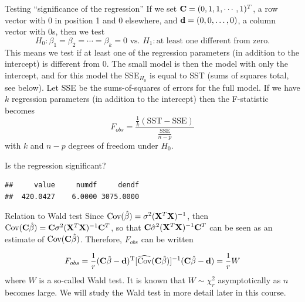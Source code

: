 \documentclass[
  ignorenonframetext,
]{beamer}
\newenvironment{Shaded}{\begin{snugshade}}{\end{snugshade}}
\newcommand{\FunctionTok}[1]{\textcolor[rgb]{0.13,0.29,0.53}{\textbf{#1}}}
\newcommand{\NormalTok}[1]{#1}
\newcommand{\SpecialCharTok}[1]{\textcolor[rgb]{0.81,0.36,0.00}{\textbf{#1}}}
\begin{document}
\begin{frame}
\begin{block}{Testing ``significance of the regression''}
\label{testing-significance-of-the-regression}
If we set \({\bf C}=(0,1,1, \cdots ,1)^T\), a row vector with 0 in
position 1 and 0 elsewhere, and \({\bf d}=(0,0,\ldots,0)\), a column
vector with 0s, then we test
\[ H_0: \beta_1=\beta_2=\cdots= \beta_k =0 \text{ vs. } H_1: \text{at least one different from zero}.\]
This means we test if at least one of the regression parameters (in
addition to the intercept) is different from 0. The small model is then
the model with only the intercept, and for this model the SSE\(_{H_0}\)
is equal to SST (sums of squares total, see below). Let SSE be the
sums-of-squares of errors for the full model. If we have \(k\)
regression parameters (in addition to the intercept) then the
F-statistic becomes
\[ F_{obs}=\frac{\frac{1}{k}(\text{SST}-\text{SSE})}{\frac{\text{SSE}}{n-p}}\]
with \(k\) and \(n-p\) degrees of freedom under \(H_0\).
\end{block}
\end{frame}

\begin{frame}[fragile]
Is the regression significant?

\begin{Shaded}
\end{Shaded}

\begin{verbatim}
##     value     numdf     dendf 
##  420.0427    6.0000 3075.0000
\end{verbatim}
\end{frame}

\begin{frame}
\begin{block}{Relation to Wald test}
\label{relation-to-wald-test}
Since \(\text{Cov}(\hat{\beta})=\sigma^2 ({\bf X}^T{\bf X})^{-1}\), then
\(\text{Cov}({\bf C}\hat{\beta})={\bf C}\sigma^2({\bf X}^T{\bf X})^{-1}{\bf C}^T\),
so that \({\bf C}\hat{\sigma}^2({\bf X}^T{\bf X})^{-1}{\bf C}^T\) can be
seen as an estimate of \(\text{Cov}({\bf C}\hat{\beta})\). Therefore,
\(F_{obs}\) can be written

\[F_{obs}=\frac{1}{r}({\bf C}\hat{{\bf \beta}}-{\bf d})^{\text T}[\widehat{\text{Cov}}({\bf C}\hat{\beta})]^{-1}({\bf C}\hat{{\bf \beta}}-{\bf d})=\frac{1}{r}W\]
where \(W\) is a so-called Wald test. It is known that
\(W\sim \chi^2_r\) asymptotically as \(n\) becomes large. We will study
the Wald test in more detail later in this course.
\end{block}
\end{frame}
\end{document}
